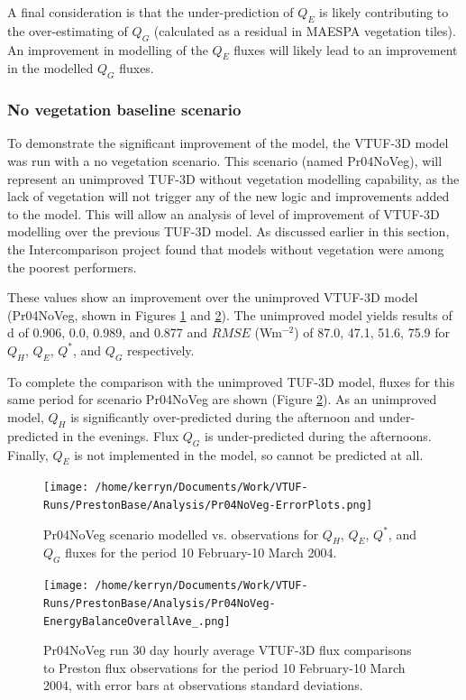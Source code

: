 \documentclass[preprint,12pt,authoryear]{elsarticle}
\begin{document}
A final consideration is that the under-prediction of $Q_{E}$ is likely contributing to the over-estimating of $Q_{G}$ (calculated as a residual in MAESPA vegetation tiles). An improvement in modelling of the $Q_{E}$ fluxes will likely lead to an improvement in the modelled $Q_{G}$ fluxes. 

\subsubsection{No vegetation baseline scenario}

To demonstrate the significant improvement of the model, the VTUF-3D model was run with a no vegetation scenario. This scenario (named Pr04NoVeg), will represent an unimproved TUF-3D without vegetation modelling capability, as the lack of vegetation will not trigger any of the new logic and improvements added to the model. This will allow an analysis of level of improvement of VTUF-3D modelling over the previous TUF-3D model. As discussed earlier in this section, the Intercomparison project found that models without vegetation were among the poorest performers.
 
These values show an improvement over the unimproved VTUF-3D model (Pr04NoVeg, shown in Figures \ref{fig:Prestonnovegerror} and \ref{fig:Prestonnoveg30day}). The unimproved model yields results of d of 0.906, 0.0, 0.989, and 0.877 and $RMSE$ (Wm$^{-2}$) of 87.0, 47.1, 51.6, 75.9 for $Q_{H}$, $Q_{E}$, $Q^{*}$, and $Q_{G}$ respectively.


To complete the comparison with the unimproved TUF-3D model, fluxes for this same period for scenario Pr04NoVeg are shown (Figure \ref{fig:Prestonnoveg30day}). As an unimproved model, $Q_{H}$ is significantly over-predicted during the afternoon and under-predicted in the evenings. Flux $Q_{G}$ is under-predicted during the afternoons. Finally, $Q_{E}$ is not implemented in the model, so cannot be predicted at all.


\begin{figure}[!htbp]
\texttt{[image: /home/kerryn/Documents/Work/VTUF-Runs/PrestonBase/Analysis/Pr04NoVeg-ErrorPlots.png]}
\caption{Pr04NoVeg scenario modelled vs. observations for $Q_{H}$, $Q_{E}$, $Q^{*}$, and $Q_{G}$ fluxes for the period 10 February-10 March 2004. \label{fig:Prestonnovegerror}}    
\end{figure}

\begin{figure}[!htbp]
\texttt{[image: /home/kerryn/Documents/Work/VTUF-Runs/PrestonBase/Analysis/Pr04NoVeg-EnergyBalanceOverallAve\_.png]}
\caption{Pr04NoVeg run 30 day hourly average VTUF-3D flux comparisons to Preston flux observations for the period 10 February-10 March 2004, with error bars at observations standard deviations. \label{fig:Prestonnoveg30day}}    
\end{figure}
\end{document}
